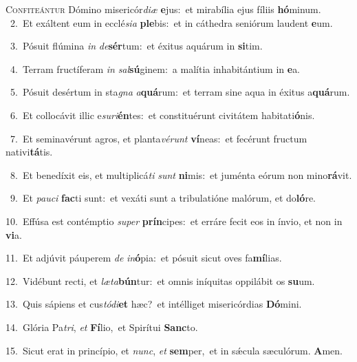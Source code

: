 \lettrine{\initial\textcolor{\initialcolor}{C}}{onfiteántur} Dómino misericór\-\textit{di}\-\textit{æ} \textbf{e}\-jus:~\star et mirabília ejus fíliis \textbf{hó}\-minum.\\
{\numbfont\textcolor{\numbcolor}{~2.}}~Et exáltent eum in ecclé\-\textit{si}\-\textit{a} \textbf{ple}\-bis:~\star et in cáthedra seniórum laudent \textbf{e}\-um.\par
{\numbfont\textcolor{\numbcolor}{~3.}}~Pósuit flúmina \textit{in} \textit{de}\-\textbf{sér}tum:~\star et éxitus aquárum in \textbf{si}\-tim.\par
{\numbfont\textcolor{\numbcolor}{~4.}}~Terram fructíferam \textit{in} \textit{sal}\-\textbf{sú}ginem:~\star a malítia inhabitántium in \textbf{e}\-a.\par
{\numbfont\textcolor{\numbcolor}{~5.}}~Pósuit desértum in sta\textit{gna} \textit{a}\-\textbf{quá}rum:~\star et terram sine aqua in éxitus a\-\textbf{quá}\-rum.\par
{\numbfont\textcolor{\numbcolor}{~6.}}~Et collocávit illic e\-\textit{su}\-\textit{ri}\textbf{én}tes:~\star et constituérunt civitátem habitati\-\textbf{ó}\-nis.\par
{\numbfont\textcolor{\numbcolor}{~7.}}~Et seminavérunt agros, et planta\-\textit{vé}\-\textit{runt} \textbf{ví}\-neas:~\star et fecérunt fructum nativi\-\textbf{tá}\-tis.\par
{\numbfont\textcolor{\numbcolor}{~8.}}~Et benedíxit eis, et multiplicá\textit{ti} \textit{sunt} \textbf{ni}\-mis:~\star et juménta eórum non mino\-\textbf{rá}\-vit.\par
{\numbfont\textcolor{\numbcolor}{~9.}}~Et \textit{pau}\-\textit{ci} \textbf{fac}\-ti sunt:~\star et vexáti sunt a tribulatióne malórum, et do\-\textbf{ló}\-re.\par
{\numbfont\textcolor{\numbcolor}{10.}}~Effúsa est contémptio \textit{su}\-\textit{per} \textbf{prín}\-cipes:~\star et erráre fecit eos in ínvio, et non in \textbf{vi}\-a.\par
{\numbfont\textcolor{\numbcolor}{11.}}~Et adjúvit páuperem \textit{de} \textit{in}\-\textbf{ó}pia:~\star et pósuit sicut oves fa\-\textbf{mí}\-lias.\par
{\numbfont\textcolor{\numbcolor}{12.}}~Vidébunt recti, et \textit{læ}\-\textit{ta}\textbf{bún}tur:~\star et omnis iníquitas oppilábit os \textbf{su}\-um.\par
{\numbfont\textcolor{\numbcolor}{13.}}~Quis sápiens et cus\-\textit{tó}\-\textit{di}\textbf{et} hæc?~\star et intélliget misericórdias \textbf{Dó}\-mini.\par
{\numbfont\textcolor{\numbcolor}{14.}}~Glória Pa\-\textit{tri}\-, \textit{et} \textbf{Fí}\-lio,~\star et Spirítui \textbf{Sanc}\-to.\par
{\numbfont\textcolor{\numbcolor}{15.}}~Sicut erat in princípio, et \textit{nunc}\-, \textit{et} \textbf{sem}\-per,~\star et in sǽcula sæculórum. \textbf{A}\-men.\par

